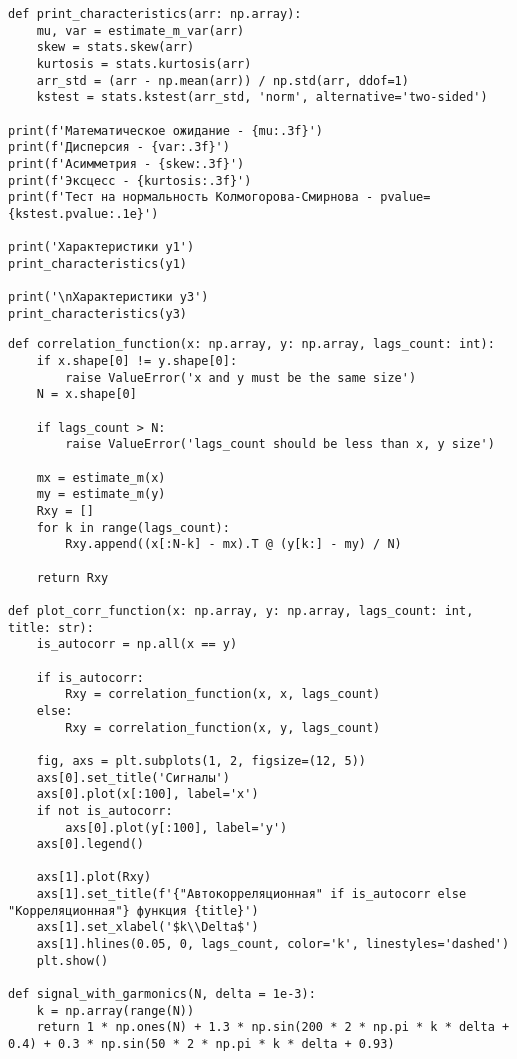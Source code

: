 {\begin{verbatim}
def print_characteristics(arr: np.array):
	mu, var = estimate_m_var(arr)
	skew = stats.skew(arr)
	kurtosis = stats.kurtosis(arr)
	arr_std = (arr - np.mean(arr)) / np.std(arr, ddof=1)
	kstest = stats.kstest(arr_std, 'norm', alternative='two-sided')

print(f'Математическое ожидание - {mu:.3f}')
print(f'Дисперсия - {var:.3f}')
print(f'Асимметрия - {skew:.3f}')
print(f'Эксцесс - {kurtosis:.3f}')
print(f'Тест на нормальность Колмогорова-Смирнова - pvalue={kstest.pvalue:.1e}')

print('Характеристики y1')
print_characteristics(y1)

print('\nХарактеристики y3')
print_characteristics(y3)
	\end{verbatim}
}


{
	\vspace{-1.5em}
	\label{corr_plot_prog}
	\begin{verbatim}
def correlation_function(x: np.array, y: np.array, lags_count: int):
	if x.shape[0] != y.shape[0]:
		raise ValueError('x and y must be the same size')
	N = x.shape[0]
	
	if lags_count > N:
		raise ValueError('lags_count should be less than x, y size')
	
	mx = estimate_m(x)
	my = estimate_m(y)
	Rxy = []
	for k in range(lags_count):
		Rxy.append((x[:N-k] - mx).T @ (y[k:] - my) / N)
	
	return Rxy

def plot_corr_function(x: np.array, y: np.array, lags_count: int, title: str):
	is_autocorr = np.all(x == y)
	
	if is_autocorr:
		Rxy = correlation_function(x, x, lags_count)
	else:
		Rxy = correlation_function(x, y, lags_count)
	
	fig, axs = plt.subplots(1, 2, figsize=(12, 5))
	axs[0].set_title('Сигналы')
	axs[0].plot(x[:100], label='x')
	if not is_autocorr:
		axs[0].plot(y[:100], label='y')
	axs[0].legend()
	
	axs[1].plot(Rxy)
	axs[1].set_title(f'{"Автокорреляционная" if is_autocorr else "Корреляционная"} функция {title}')
	axs[1].set_xlabel('$k\\Delta$')
	axs[1].hlines(0.05, 0, lags_count, color='k', linestyles='dashed')
	plt.show()

def signal_with_garmonics(N, delta = 1e-3):
	k = np.array(range(N))
	return 1 * np.ones(N) + 1.3 * np.sin(200 * 2 * np.pi * k * delta + 0.4) + 0.3 * np.sin(50 * 2 * np.pi * k * delta + 0.93)


\end{verbatim}}
